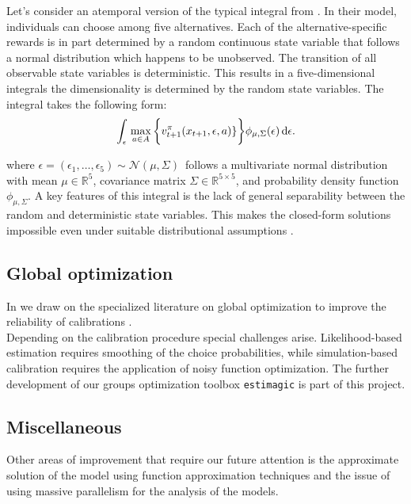 \noindent Let's consider an atemporal version of the typical integral from \citet{Keane.1997}. In their model, individuals can choose among five alternatives. Each of the alternative-specific rewards is in part determined by a random continuous state variable that follows a normal distribution which happens to be unobserved. The transition of all observable state variables is deterministic. This results in a five-dimensional integrals the dimensionality is determined by the random state variables. The integral takes the following form:
%
\begin{align*}
   \int_{\epsilon}\, \max_{a\in A} \bigg\{v_{t + 1}^\pi(x_{t + 1}, \epsilon, a)\}\bigg\} \phi_{\mu, \Sigma}(\epsilon) \mathop{}\!\mathrm{d}\epsilon.
\end{align*}

\noindent where $\epsilon = (\epsilon_1, \dots, \epsilon_5) \sim \mathcal{N}(\mu, \Sigma)\,$ follows a multivariate normal distribution with mean $\mu \in \mathbb{R}^{5}$, covariance matrix $ \Sigma \in \mathbb{R}^{5 \times 5}$, and probability density function $\phi_{\mu, \Sigma}$. A key features of this integral is the lack of general separability between the random and deterministic state variables. This makes the closed-form solutions impossible even under suitable distributional assumptions \citep{McFadden.1978,Rust.1987}.
\subsection{Global optimization}

In \citet{Gabler.2020} we draw on the specialized literature on global optimization to improve the reliability of calibrations \citep{Locatelli.2013}.\\

\noindent Depending on the calibration procedure special challenges arise. Likelihood-based estimation requires smoothing of the choice probabilities, while simulation-based calibration requires the application of noisy function optimization. The further development of our groups optimization toolbox \verb+estimagic+ \citep{Gabler.2019} is part of this project.
\subsection{Miscellaneous} Other areas of improvement that require our future attention is the approximate solution of the model using function approximation techniques and the issue of using massive parallelism for the analysis of the models.
